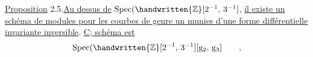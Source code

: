 \uline{Proposition} 2.5.\quad \uline{Au dessus de} $\operatorname{Spec}(\handwritten{\mathbb{Z}}[2^{-1},\,3^{-1}]$, \uline{il existe un schéma de modules pour les courbes de genre un munies d'une forme différentielle invariante inversible}. \uline{C; schéma est}
\[
\operatorname{Spec}(\handwritten{\mathbb{Z}}[2^{-1},\,3^{-1}][\mathrm{g}_{2},\,\mathrm{g}_{3}]\qquad,
\]
\clearpage
